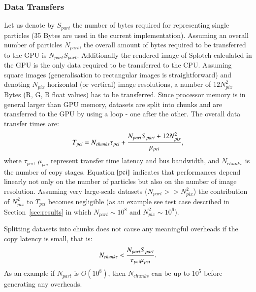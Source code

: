 \documentclass[1p]{elsarticle}
\begin{document}
\subsubsection{Data Transfers}
Let us denote by $S_{part}$ the number of bytes required for representing single particles (35 Bytes are used in the current implementation). Assuming an overall number of particles $N_{part}$, the overall amount of bytes required to be transferred to the GPU is $N_{part} S_{part}$. Additionally the rendered image of Splotch calculated in the GPU is the only data required to be transferred to the CPU. Assuming square images (generalisation to rectangular images is straightforward) and denoting $N_{pix}$ horizontal (or vertical) image resolutions, a number of $12 N_{pix}^2$ Bytes (R, G, B float values) has to be transferred. 
Since processor memory is in general larger than GPU memory,
datasets are split into chunks and are transferred to the GPU by using a loop - one after the other. The overall data transfer times are:
\begin{equation}\label{pci}
T_{pci} =  N_{chunks} \tau_{pci} + {N_{part} S_{part} + 12 N_{pix}^2 \over 
\mu_{pci}},
\end{equation}
where $\tau_{pci}$, $\mu_{pci}$ represent transfer time latency and bus bandwidth, and $N_{chunks}$ is the number of copy stages. Equation $\eqref{pci}$ indicates that performances depend linearly not only on the number of particles but also on the number of image resolution. Assuming very large-scale datasets ($N_{part} >> N_{pix}^2$) the contribution of $N_{pix}^2$ to $T_{pci}$ becomes negligible (as an example see test case described in Section~\ref{sec:results} in which $N_{part} \sim 10^8$
and $N_{pix}^2 \sim 10^6$).

Splitting datasets into chunks does not cause any meaningful overheads if the copy latency is small, that is:
\begin{equation}
N_{chunks} < {N_{part} S_{part}\over \tau_{pci}\mu_{pci}}.
\end{equation}
As an example if $N_{part}$ is $O(10^8)$, then $N_{chunks}$ can be up to $10^5$ before
generating any overheads. 
\end{document}
